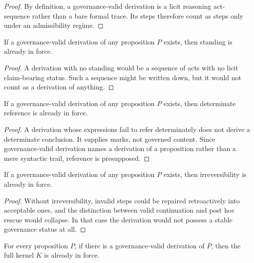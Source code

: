 \begin{proof}
By definition, a governance-valid derivation is a licit reasoning act-sequence rather than a bare formal trace. Its steps therefore count as steps only under an admissibility regime.
\end{proof}

\begin{lemma}
\label{lem:A-der-stand}
If a governance-valid derivation of any proposition $P$ exists, then standing is already in force.
\end{lemma}

\begin{proof}
A derivation with no standing would be a sequence of acts with no licit claim-bearing status. Such a sequence might be written down, but it would not count as a derivation of anything.
\end{proof}

\begin{lemma}
\label{lem:A-der-ref}
If a governance-valid derivation of any proposition $P$ exists, then determinate reference is already in force.
\end{lemma}

\begin{proof}
A derivation whose expressions fail to refer determinately does not derive a determinate conclusion. It supplies marks, not governed content. Since governance-valid derivation names a derivation of a proposition rather than a mere syntactic trail, reference is presupposed.
\end{proof}

\begin{lemma}
\label{lem:A-der-irr}
If a governance-valid derivation of any proposition $P$ exists, then irreversibility is already in force.
\end{lemma}

\begin{proof}
Without irreversibility, invalid steps could be repaired retroactively into acceptable ones, and the distinction between valid continuation and post hoc rescue would collapse. In that case the derivation would not possess a stable governance status at all.
\end{proof}

\begin{corollary}
\label{cor:A-global-presupposition}
For every proposition $P$, if there is a governance-valid derivation of $P$, then the full kernel $K$ is already in force.
\end{corollary}

